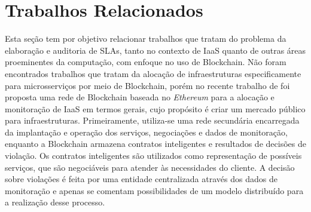 



\section{Trabalhos Relacionados}
\label{sec:trabalhos_relacionados}

Esta seção tem por objetivo relacionar trabalhos que tratam do problema da elaboração e auditoria de \acp{SLA}, tanto no contexto de \ac{IaaS} quanto de outras áreas proeminentes da computação, com enfoque no uso de Blockchain.
%
Não foram encontrados trabalhos que tratam da alocação de infraestruturas especificamente para microsserviços por meio de Blockchain, porém no recente trabalho de  foi proposta uma rede de Blockchain baseada no \textit{Ethereum} para a alocação e monitoração de \ac{IaaS} em termos gerais, cujo propósito é criar um mercado público para infraestruturas. Primeiramente, utiliza-se uma rede secundária encarregada da implantação e operação dos serviços, negociações e dados de monitoração, enquanto a Blockchain armazena contratos inteligentes e resultados de decisões de violação. Os contratos inteligentes são utilizados como representação de possíveis serviços, que são negociáveis para atender às necessidades do cliente. A decisão sobre violações é feita por uma entidade centralizada através dos dados de monitoração e apenas se comentam possibilidades de um modelo distribuído para a realização desse processo.


